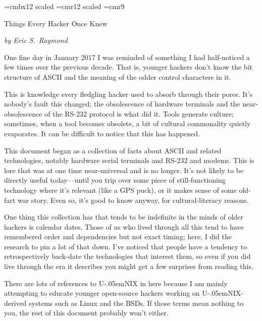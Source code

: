 \font\biggerbold=cmbx12 scaled %
\font\biggertxt=cmr12 scaled %
\font\ninerm=cmr9
\let\mc=\ninerm %
\def\acro#1{{\mc #1\spacefactor1000}}%
\def\CEE/{\acro C}%
\def\UNIX/{{\mc U\kern-.05emNIX\spacefactor1000}}%
\def\ASCII/{\acro{ASCII}}%
\def\RSTTT/{\acro{RS-232}}%
\def\title#1{\leavevmode\vskip 0.5in\centerline{\biggertxt #1}\par}%
\def\subtitle#1{\medskip\centerline{\sl #1}}%
\def\sect#1.{\bigbreak\noindent{\biggerbold #1}\par\noindent\ignorespaces}%
\def\dlist#1.{\par\noindent\hangindent=3em\hangafter=1\line{#1\hfil}}%
%
%
%
\title{Things Every Hacker Once Knew}
\subtitle{by Eric S.~Raymond}
\vskip 0.5in
\noindent One fine day in January 2017 I was reminded of something I had half-noticed a
few times over the previous decade. That is, younger hackers don't know the bit
structure of \ASCII/ and the meaning of the odder control characters in it.

This is knowledge every fledgling hacker used to absorb through their pores.
It's nobody's fault this changed; the obsolescence of hardware terminals and
the near-obsolescence of the \RSTTT/ protocol is what did it. Tools generate
culture; sometimes, when a tool becomes obsolete, a bit of cultural commonality
quietly evaporates. It can be difficult to notice that this has happened.

This document began as a collection of facts about \ASCII/ and related
technologies, notably hardware serial terminals and \RSTTT/ and modems. This is
lore that was at one time near-universal and is no longer. It's not likely to
be directly useful today---until you trip over some piece of still-functioning
technology where it's relevant (like a \acro{GPS} puck), or it makes sense of some
old-fart war story. Even so, it's good to know anyway, for cultural-literacy
reasons.

One thing this collection has that tends to be indefinite in the minds of older
hackers is calendar dates. Those of us who lived through all this tend to have
remembered order and dependencies but not exact timing; here, I did the
research to pin a lot of that down. I've noticed that people have a tendency to
retrospectively back-date the technologies that interest them, so even if you
did live through the era it describes you might get a few surprises from
reading this.

There are lots of references to \UNIX/ in here because I am mainly attempting to
educate younger open-source hackers working on \UNIX/-derived systems such as
Linux and the \acro{BSD}s. If those terms mean nothing to you, the rest of this
document probably won't either.

